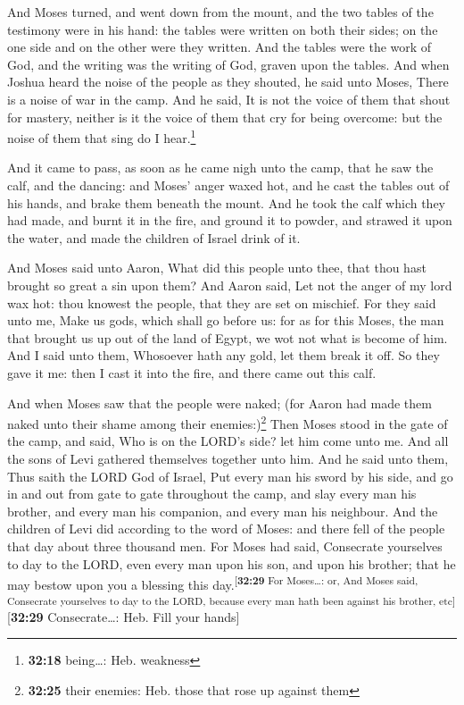  And Moses turned, and went down from the mount, and the
two tables of the testimony were in his hand: the tables were written on
both their sides; on the one side and on the other were they written.
 And the tables were the work of God, and the writing was
the writing of God, graven upon the tables.  And when
Joshua heard the noise of the people as they shouted, he said unto
Moses, There is a noise of war in the camp.  And he said,
It is not the voice of them that shout for mastery, neither is it the
voice of them that cry for being overcome: but the noise of them that
sing do I hear.\footnote{\textbf{32:18} being\ldots: Heb. weakness}

 And it came to pass, as soon as he came nigh unto the
camp, that he saw the calf, and the dancing: and Moses' anger waxed hot,
and he cast the tables out of his hands, and brake them beneath the
mount.  And he took the calf which they had made, and
burnt it in the fire, and ground it to powder, and strawed it upon the
water, and made the children of Israel drink of it.

 And Moses said unto Aaron, What did this people unto
thee, that thou hast brought so great a sin upon them? 
And Aaron said, Let not the anger of my lord wax hot: thou knowest the
people, that they are set on mischief.  For they said
unto me, Make us gods, which shall go before us: for as for this Moses,
the man that brought us up out of the land of Egypt, we wot not what is
become of him.  And I said unto them, Whosoever hath any
gold, let them break it off. So they gave it me: then I cast it into the
fire, and there came out this calf.

 And when Moses saw that the people were naked; (for
Aaron had made them naked unto their shame among their
enemies:)\footnote{\textbf{32:25} their enemies: Heb. those that rose up
  against them}  Then Moses stood in the gate of the
camp, and said, Who is on the LORD's side? let him come unto me. And all
the sons of Levi gathered themselves together unto him. 
And he said unto them, Thus saith the LORD God of Israel, Put every man
his sword by his side, and go in and out from gate to gate throughout
the camp, and slay every man his brother, and every man his companion,
and every man his neighbour.  And the children of Levi
did according to the word of Moses: and there fell of the people that
day about three thousand men.  For Moses had said,
Consecrate yourselves to day to the LORD, even every man upon his son,
and upon his brother; that he may bestow upon you a blessing this
day.\textsuperscript{{[}\textbf{32:29} For Moses\ldots: or, And Moses
said, Consecrate yourselves to day to the LORD, because every man hath
been against his brother, etc{]}}{[}\textbf{32:29} Consecrate\ldots:
Heb. Fill your hands{]}

